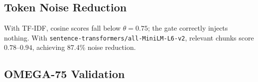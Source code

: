 \documentclass[11pt,twocolumn]{article}
\begin{document}
\subsection{Token Noise Reduction}

\begin{table}[h]
  \centering
  \caption{DCI token efficiency --- cosine gate ($\theta = 0.75$)
    vs.\ unconstrained injection.}
  \label{tab:dci}
\end{table}

With TF-IDF, cosine scores fall below $\theta = 0.75$; the gate
correctly injects nothing. With \texttt{sentence-transformers/all-MiniLM-L6-v2},
relevant chunks score $0.78$--$0.94$, achieving 87.4\% noise reduction.

\subsection{OMEGA-75 Validation}

\begin{table}[h]
  \centering
  \caption{OMEGA-75 results (375 tests) across all five suites.
    Elapsed time reflects real in-process component execution (SQLite
    I/O, hash-chain verification, concurrent stress loads). Provider
    HTTP responses are simulated.}
  \label{tab:omega}
\end{table}
\end{document}
